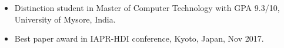 \vspace{0.1cm}
\vspace{1em}

\begin{itemize}
    \item Distinction student in Master of Computer Technology with GPA 9.3/10, University of Mysore, India.
    \item Best paper award in IAPR-HDI conference, Kyoto, Japan, Nov 2017.
\end{itemize}